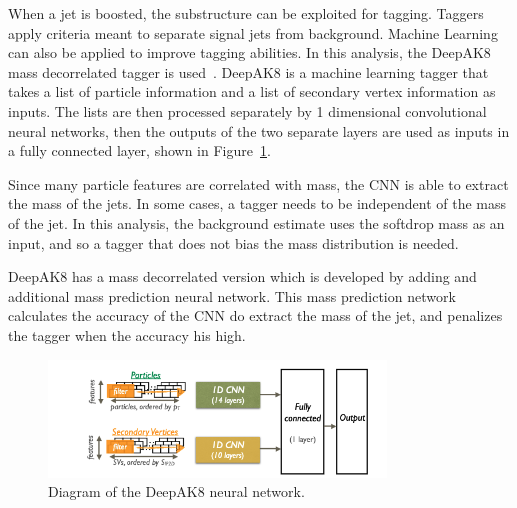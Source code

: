 When a jet is boosted, the substructure can be exploited for tagging. Taggers apply criteria meant to separate signal jets from background. Machine Learning can also be applied to improve tagging abilities. In this analysis, the DeepAK8 mass decorrelated tagger is used~\cite{CMS:2020poo}. DeepAK8 is a machine learning tagger that takes a list of particle information and a list of secondary vertex information as inputs. The lists are then processed separately by 1 dimensional convolutional neural networks, then the outputs of the two separate layers are used as inputs in a fully connected layer, shown in Figure~\ref{fig:deepak8}.

Since many particle features are correlated with mass, the CNN is able to extract the mass of the jets. In some cases, a tagger needs to be independent of the mass of the jet. In this analysis, the background estimate uses the softdrop mass as an input, and so a tagger that does not bias the mass distribution is needed.

DeepAK8 has a mass decorrelated version which is developed by adding and additional mass prediction neural network. This mass prediction network calculates the accuracy of the CNN do extract the mass of the jet, and penalizes the tagger when the accuracy his high. 


\begin{figure}[h]
\centering
	\includegraphics[width=0.8\textwidth]{figures/deepak8.png}
	\caption{Diagram of the DeepAK8 neural network.}
	\label{fig:deepak8}
\end{figure}



